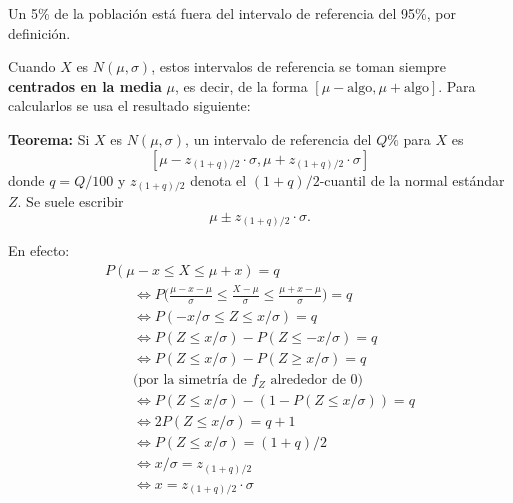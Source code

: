 \documentclass[
  spanish,
  letterpaper,
  DIV=11,
  numbers=noendperiod]{scrreprt}
\begin{document}
\begin{tcolorbox}[enhanced jigsaw, arc=.35mm, bottomrule=.15mm, bottomtitle=1mm, breakable, colback=white, colbacktitle=quarto-callout-important-color!10!white, colframe=quarto-callout-important-color-frame, coltitle=black, left=2mm, leftrule=.75mm, opacityback=0, opacitybacktitle=0.6, rightrule=.15mm, title=\textcolor{quarto-callout-important-color}{\faExclamation}\hspace{0.5em}{Importante}, titlerule=0mm, toprule=.15mm, toptitle=1mm]

Un 5\% de la población está fuera del intervalo de referencia del 95\%,
por definición.

\end{tcolorbox}

Cuando \(X\) es \(N(\mu,\sigma)\), estos intervalos de referencia se
toman siempre \textbf{centrados en la media} \(\mu\), es decir, de la
forma \([\mu-\text{algo},\mu+\text{algo}]\). Para calcularlos se usa el
resultado siguiente:

\textbf{Teorema:} Si \(X\) es \(N(\mu,\sigma)\), un intervalo de
referencia del \(Q\%\) para \(X\) es \[
[\mu- z_{(1+q)/2}\cdot \sigma, \mu+ z_{(1+q)/2}\cdot \sigma]
\] donde \(q=Q/100\) y \(z_{(1+q)/2}\) denota el \((1+q)/2\)-cuantil de
la normal estándar \(Z\). Se suele escribir \[
\mu\pm z_{(1+q)/2}\cdot \sigma.
\]

En efecto: \[
\begin{array}{l}
P(\mu-x\leqslant X\leqslant \mu+x)=q\\
\qquad \Longleftrightarrow \displaystyle P\Big(\frac{\mu-x-\mu}{\sigma}\leqslant \frac{X-\mu}{\sigma}\leqslant \frac{\mu+x-\mu}{\sigma}\Big)=q\\
\qquad \Longleftrightarrow \displaystyle P(-x/{\sigma}\leqslant Z\leqslant {x}/{\sigma})=q\\
\qquad \Longleftrightarrow \displaystyle P(Z\leqslant {x}/{\sigma})-P(Z\leqslant -{x}/{\sigma})=q\\
\qquad \Longleftrightarrow \displaystyle P(Z\leqslant {x}/{\sigma})-P(Z\geqslant {x}/{\sigma})=q\\
\qquad \text{(por la simetría de $f_Z$ alrededor de 0)}\\
\qquad \Longleftrightarrow \displaystyle P(Z\leqslant {x}/{\sigma})-(1-P(Z\leqslant {x}/{\sigma}))=q\\
\qquad \Longleftrightarrow \displaystyle 2P(Z\leqslant {x}/{\sigma})=q+1\\
\qquad \Longleftrightarrow P(Z\leqslant {x}/{\sigma})=(1+q)/2\\
\qquad \Longleftrightarrow x/\sigma=
z_{(1+q)/2}\\
\qquad \Longleftrightarrow x=z_{(1+q)/2}\cdot \sigma
\end{array}
\]
\end{document}
